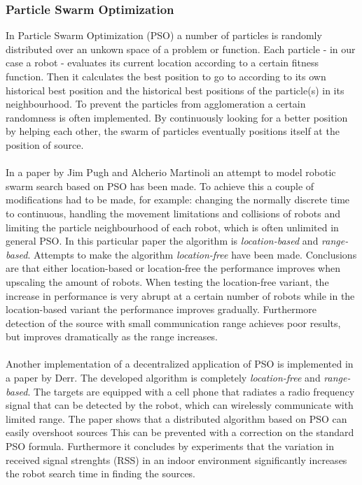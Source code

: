 	\subsubsection{Particle Swarm Optimization}
		In Particle Swarm Optimization (PSO) a number of particles is randomly distributed over an unkown space of a problem or function. 
		Each particle - in our case a robot - evaluates its current location according to a certain fitness function.
		Then it calculates the best position to go to according to its own historical best position and the historical best positions of the particle(s) in its neighbourhood.
		To prevent the particles from agglomeration a certain randomness is often implemented. 
		By continuously looking for a better position by helping each other, the swarm of particles eventually positions itself at the position of source. \cite{poli2007particle,pugh2007inspiring,derr2009multi}\\
		\\
		In a paper by Jim Pugh and Alcherio Martinoli an attempt to model robotic swarm search based on PSO has been made. \cite{pugh2007inspiring}
		To achieve this a couple of modifications had to be made, for example: changing the normally discrete time to continuous, handling the movement limitations and collisions of robots and limiting the particle neighbourhood of each robot, which is often unlimited in general PSO.
		In this particular paper the algorithm is \emph{location-based} and \emph{range-based}.
		Attempts to make the algorithm \emph{location-free} have been made.
		Conclusions are that either location-based or location-free the performance improves when upscaling the amount of robots.
		When testing the location-free variant, the increase in performance is very abrupt at a certain number of robots while in the location-based variant the performance improves gradually.
		Furthermore detection of the source with small communication range achieves poor results, but improves dramatically as the range increases.\\
		\\
		Another implementation of a decentralized application of PSO is implemented in a paper by Derr. \cite{derr2009multi}
		The developed algorithm is completely \emph{location-free} and \emph{range-based}.
		The targets are equipped with a cell phone that radiates a radio frequency signal that can be detected by the robot, which can wirelessly communicate with limited range.
		The paper shows that a distributed algorithm based on PSO can easily overshoot sources
		This can be prevented with a correction on the standard PSO formula.
		Furthermore it concludes by experiments that the variation in received signal strenghts (RSS) in an indoor environment significantly increases the robot search time in finding the sources.

